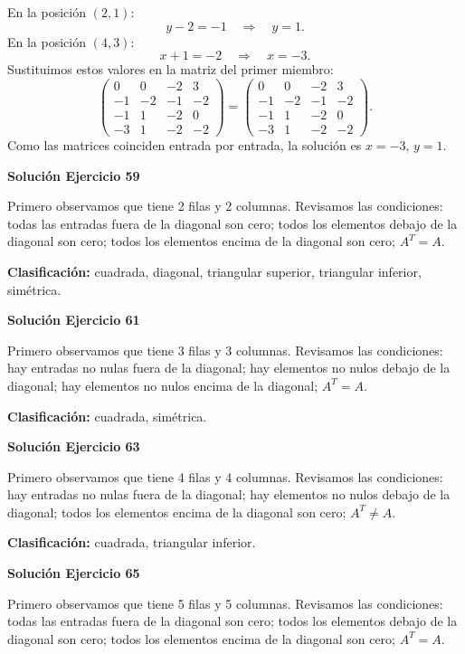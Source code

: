 \documentclass[12pt]{article}
\theoremstyle{remark}
\begin{document}
En la posición $(2,1)$:
\[
y - 2=-1\quad\Longrightarrow\quad y=1.
\]
En la posición $(4,3)$:
\[
x + 1=-2\quad\Longrightarrow\quad x=-3.
\]
Sustituimos estos valores en la matriz del primer miembro:
\[
\begin{pmatrix}0&0&-2&3\\-1&-2&-1&-2\\-1&1&-2&0\\-3&1&-2&-2\end{pmatrix}=\begin{pmatrix}0&0&-2&3\\-1&-2&-1&-2\\-1&1&-2&0\\-3&1&-2&-2\end{pmatrix}.
\]
Como las matrices coinciden entrada por entrada, la solución es $x=-3$, $y=1$.


\par\bigskip\noindent\textbf{Solución Ejercicio 59}\par\nobreak
Primero observamos que tiene 2 filas y 2 columnas. Revisamos las condiciones: todas las entradas fuera de la diagonal son cero; todos los elementos debajo de la diagonal son cero; todos los elementos encima de la diagonal son cero; $A^T=A$.

\textbf{Clasificación:} cuadrada, diagonal, triangular superior, triangular inferior, simétrica.


\par\bigskip\noindent\textbf{Solución Ejercicio 61}\par\nobreak
Primero observamos que tiene 3 filas y 3 columnas. Revisamos las condiciones: hay entradas no nulas fuera de la diagonal; hay elementos no nulos debajo de la diagonal; hay elementos no nulos encima de la diagonal; $A^T=A$.

\textbf{Clasificación:} cuadrada, simétrica.


\par\bigskip\noindent\textbf{Solución Ejercicio 63}\par\nobreak
Primero observamos que tiene 4 filas y 4 columnas. Revisamos las condiciones: hay entradas no nulas fuera de la diagonal; hay elementos no nulos debajo de la diagonal; todos los elementos encima de la diagonal son cero; $A^T\ne A$.

\textbf{Clasificación:} cuadrada, triangular inferior.


\par\bigskip\noindent\textbf{Solución Ejercicio 65}\par\nobreak
Primero observamos que tiene 5 filas y 5 columnas. Revisamos las condiciones: todas las entradas fuera de la diagonal son cero; todos los elementos debajo de la diagonal son cero; todos los elementos encima de la diagonal son cero; $A^T=A$.
\end{document}
